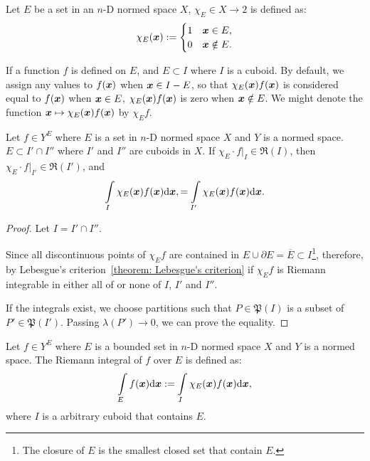 \documentclass[openany]{book}
\begin{document}
\begin{definition}
	Let $E$ be a set in an $n$-D normed space $X$, $\chi_E \in X \to 2$ is defined as:
	\begin{equation*}
		\chi_E(\boldsymbol{x}) := \begin{cases}
			1 & \boldsymbol{x} \in E,
			\\
			0 & \boldsymbol{x} \notin E.
		\end{cases}
	\end{equation*}
\end{definition}

If a function $f$ is defined on $E$, and $E \subset I$ where $I$ is a cuboid. 
By default, we assign any values to $f(\boldsymbol{x})$ when $\boldsymbol{x} \in I - E$, so that $\chi_E(\boldsymbol{x}) f(\boldsymbol{x})$ is considered equal to $f(\boldsymbol{x})$ when $\boldsymbol{x} \in E$, $\chi_E(\boldsymbol{x}) f(\boldsymbol{x})$ is zero when $\boldsymbol{x} \notin E$. 
We might denote the function $\boldsymbol{x} \mapsto \chi_E(\boldsymbol{x}) f(\boldsymbol{x})$ by $\chi_E f$.

\begin{lemma}
	Let $f \in Y^E$ where $E$ is a set in $n$-D normed space $X$ and $Y$ is a normed space.
	$E \subset I' \cap I''$ where $I'$ and $I''$ are cuboids in $X$. 
	If $\chi_E \cdot f|_I \in \mathfrak R(I)$, then $\chi_E \cdot f|_{I'} \in \mathfrak R(I')$, and
	\begin{equation*}
		\int\limits_{I} \chi_E(\boldsymbol{x}) f(\boldsymbol{x}) \mathrm{d} \boldsymbol{x},
			= \int\limits_{I'} \chi_E(\boldsymbol{x}) f(\boldsymbol{x}) \mathrm{d} \boldsymbol{x}.
	\end{equation*} 
\end{lemma}
\begin{proof}
	Let $I = I' \cap I''$. 

	Since all discontinuous points of $\chi_E f$ are contained in $E \cup \partial E = \overline{E}\subset I$\footnote{The closure of $E$ is the smallest closed set that contain $E$.}, therefore, by Lebesgue's criterion~\ref{theorem: Lebesgue's criterion} if $\chi_E f$ is Riemann integrable in either all of or none of $I$, $I'$ and $I''$.

	If the integrals exist, we choose partitions such that $P \in \mathfrak P(I)$ is a subset of $P' \in \mathfrak P(I')$. Passing $\lambda(P') \to 0$, we can prove the equality.
\end{proof}

\begin{definition}
	Let $f \in Y^E$ where $E$ is a bounded set in $n$-D normed space $X$ and $Y$ is a normed space.
	The Riemann integral of $f$ over $E$ is defined as:
	\begin{equation*}
		\int\limits_E f(\boldsymbol{x}) \mathrm{d} \boldsymbol{x} := \int\limits_I \chi_E(\boldsymbol{x}) f(\boldsymbol{x}) \mathrm{d} \boldsymbol{x},
	\end{equation*}
	where $I$ is a arbitrary cuboid that contains $E$.
\end{definition}
\end{document}
